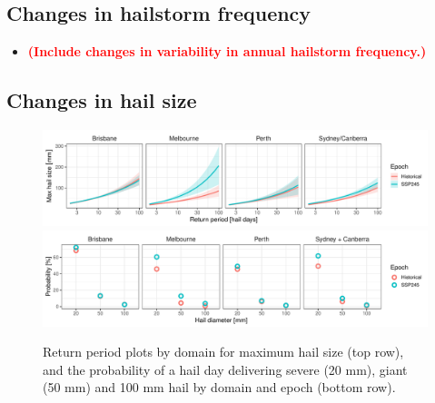 \documentclass[]{agujournal2019}\usepackage[]{graphicx}\usepackage[]{xcolor}
\newcommand*{\todo}[1]{\textbf{\textcolor{red}{(#1)}}}
\begin{document}
\subsection{Changes in hailstorm frequency}

\begin{itemize}
\item \todo{Include changes in variability in annual hailstorm frequency.}
\end{itemize}

\subsection{Changes in hail size}

\begin{figure}[!ht]
      \includegraphics[width=\textwidth]{figures/return_periods_hail}
      \includegraphics[width=\textwidth]{figures/hail_probs}
      \caption{Return period plots by domain for maximum hail size (top row), and the probability of a hail day delivering severe (20 mm), giant (50 mm) and 100 mm hail by domain and epoch (bottom row).}
      \label{fig:return_periods_probs_hail}
\end{figure}
\end{document}

